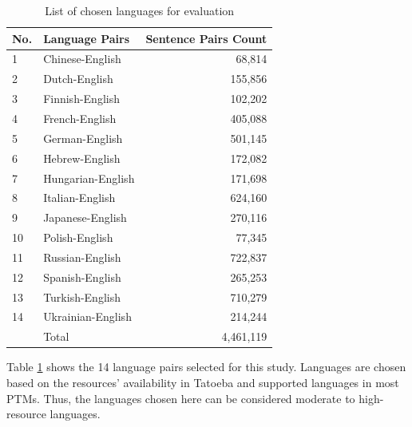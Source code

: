 \documentclass[a4paper, 11pt]{article}
\begin{document}
\begin{table}[htbp]
    \centering
    \large
    \begin{tabular}{llr}
        \hline
        \textbf{No.} & \textbf{Language Pairs} & \textbf{Sentence Pairs Count} \\
        \hline
        1            & Chinese-English         & 68,814                        \\
        2            & Dutch-English           & 155,856                       \\
        3            & Finnish-English         & 102,202                       \\
        4            & French-English          & 405,088                       \\
        5            & German-English          & 501,145                       \\
        6            & Hebrew-English          & 172,082                       \\
        7            & Hungarian-English       & 171,698                       \\
        8            & Italian-English         & 624,160                       \\
        9            & Japanese-English        & 270,116                       \\
        10           & Polish-English          & 77,345                        \\
        11           & Russian-English         & 722,837                       \\
        12           & Spanish-English         & 265,253                       \\
        13           & Turkish-English         & 710,279                       \\
        14           & Ukrainian-English       & 214,244                       \\
        \hline
                     & Total                   & 4,461,119                     \\
        \hline
    \end{tabular}
    \caption{List of chosen languages for evaluation}
    \label{table:eval_languages}
\end{table}

Table \ref{table:eval_languages} shows the 14 language pairs selected for this study. Languages are chosen based on the resources' availability in Tatoeba and supported languages in most PTMs. Thus, the languages chosen here can be considered moderate to high-resource languages.
\end{document}

